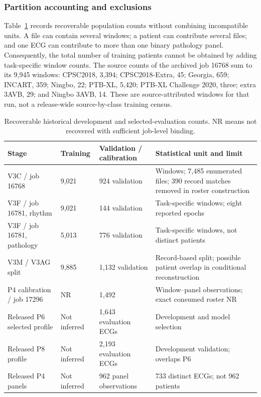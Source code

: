 \subsubsection{Partition accounting and exclusions}
\label{sec:partition-accounting}
Table~\ref{tab:historical-partitions} records recoverable population counts without combining incompatible units. A file can contain several windows; a patient can contribute several files; and one ECG can contribute to more than one binary pathology panel. Consequently, the total number of training patients cannot be obtained by adding task-specific window counts. The source counts of the archived job 16768 sum to its 9,945 windows: CPSC2018, 3,394; CPSC2018-Extra, 45; Georgia, 659; INCART, 359; Ningbo, 22; PTB-XL, 5,420; PTB-XL Challenge 2020, three; extra 3AVB, 29; and Ningbo 3AVB, 14. These are source-attributed windows for that run, not a release-wide source-by-class training census.

\begin{table}[tbp]
\caption{Recoverable historical development and selected-evaluation counts. NR means not recovered with sufficient job-level binding.\label{tab:historical-partitions}}
\centering\small
\begin{tabular}{@{}p{.26\linewidth}p{.23\linewidth}p{.23\linewidth}p{.21\linewidth}@{}}
\toprule
Stage & Training & Validation / calibration & Statistical unit and limit \\
\midrule
V3C / job 16768 & 9,021 & 924 validation & Windows; 7,485 enumerated files; 390 record matches removed in roster construction \\
V3F / job 16781, rhythm & 9,021 & 144 validation & Task-specific windows; eight reported epochs \\
V3F / job 16781, pathology & 5,013 & 776 validation & Task-specific windows, not distinct patients \\
V3M / V3AG split & 9,885 & 1,132 validation & Record-based split; possible patient overlap in conditional reconstruction \\
P4 calibration / job 17296 & NR & 1,492 & Window--panel observations; exact consumed roster NR \\
Released P6 selected profile & Not inferred & 1,643 evaluation ECGs & Development and model selection \\
Released P8 profile & Not inferred & 2,193 evaluation ECGs & Development validation; overlaps P6 \\
Released P4 panels & Not inferred & 962 panel observations & 733 distinct ECGs; not 962 patients \\
\bottomrule
\end{tabular}
\end{table}

